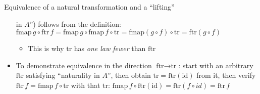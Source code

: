 \documentclass[english]{beamer}
\begin{document}
\begin{frame}{Equivalence of a natural transformation and a ``lifting''}
\begin{itemize}
in $A$'') follows from the definition: {\footnotesize{}$\text{fmap}\,g\circ\text{ftr}\,f=\text{fmap}\,g\circ\text{fmap}\,f\circ\text{tr}=\text{fmap}\left(g\circ f\right)\circ\text{tr}=\text{ftr}\left(g\circ f\right)$} 
\begin{itemize}
\item This is why {\footnotesize{}$\text{tr}$} has \emph{one law fewer}
than {\footnotesize{}$\text{ftr}$}{\footnotesize \par}
\end{itemize}
\item To demonstrate equivalence in the direction {\footnotesize{}$\text{ftr}\rightarrow\text{tr}$}:
start with an arbitrary {\footnotesize{}$\text{ftr}$} satisfying
``naturality in $A$'', then obtain {\footnotesize{}$\text{tr}=\text{ftr}\left(\text{id}\right)$}
from it, then verify {\footnotesize{}$\text{ftr}\,f=\text{fmap}\,f\circ\text{tr}$}
with that {\footnotesize{}$\text{tr}$}: {\footnotesize{}$\text{fmap}\,f\circ\text{ftr}\left(\text{id}\right)=\text{ftr}\left(f\circ id\right)=\text{ftr}\,f$}{\footnotesize \par}
\end{itemize}
\end{frame}
\end{document}
